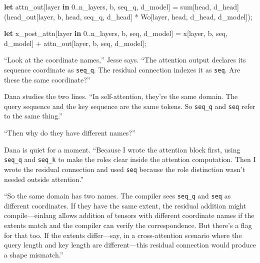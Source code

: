 \documentclass[11pt,]{article}
\newenvironment{Shaded}{}{}
\newcommand{\DecValTok}[1]{\textcolor[rgb]{0.25,0.63,0.44}{#1}}
\newcommand{\KeywordTok}[1]{\textcolor[rgb]{0.00,0.44,0.13}{\textbf{#1}}}
\newcommand{\NormalTok}[1]{#1}
\newcommand{\OperatorTok}[1]{\textcolor[rgb]{0.40,0.40,0.40}{#1}}
\begin{document}
\begin{Shaded}
\begin{Highlighting}[]
\KeywordTok{let}\NormalTok{ attn_out}\OperatorTok{[}\NormalTok{layer }\KeywordTok{in} \DecValTok{0.}\NormalTok{.n_layers, b, seq_q, d_model}\OperatorTok{]}\NormalTok{ =}
\NormalTok{    sum}\OperatorTok{[}\NormalTok{head, d_head}\OperatorTok{]}\NormalTok{(head_out}\OperatorTok{[}\NormalTok{layer, b, head, seq_q, d_head}\OperatorTok{]}\NormalTok{ *}
\NormalTok{                       Wo}\OperatorTok{[}\NormalTok{layer, head, d_head, d_model}\OperatorTok{]}\NormalTok{);}

\KeywordTok{let}\NormalTok{ x_post_attn}\OperatorTok{[}\NormalTok{layer }\KeywordTok{in} \DecValTok{0.}\NormalTok{.n_layers, b, seq, d_model}\OperatorTok{]}\NormalTok{ =}
\NormalTok{    x}\OperatorTok{[}\NormalTok{layer, b, seq, d_model}\OperatorTok{]}\NormalTok{ + attn_out}\OperatorTok{[}\NormalTok{layer, b, seq, d_model}\OperatorTok{]}\NormalTok{;}
\end{Highlighting}
\end{Shaded}

``Look at the coordinate names,'' Jesse says. ``The attention output
declares its sequence coordinate as \texttt{seq\_q}. The residual
connection indexes it as \texttt{seq}. Are these the same coordinate?''

Dana studies the two lines. ``In self-attention, they're the same
domain. The query sequence and the key sequence are the same tokens. So
\texttt{seq\_q} and \texttt{seq} refer to the same thing.''

``Then why do they have different names?''

Dana is quiet for a moment. ``Because I wrote the attention block first,
using \texttt{seq\_q} and \texttt{seq\_k} to make the roles clear inside
the attention computation. Then I wrote the residual connection and used
\texttt{seq} because the role distinction wasn't needed outside
attention.''

``So the same domain has two names. The compiler sees \texttt{seq\_q}
and \texttt{seq} as different coordinates. If they have the same extent,
the residual addition might compile---einlang allows addition of tensors
with different coordinate names if the extents match and the compiler
can verify the correspondence. But there's a flag for that too. If the
extents differ---say, in a cross-attention scenario where the query
length and key length are different---this residual connection would
produce a shape mismatch.''
\end{document}

